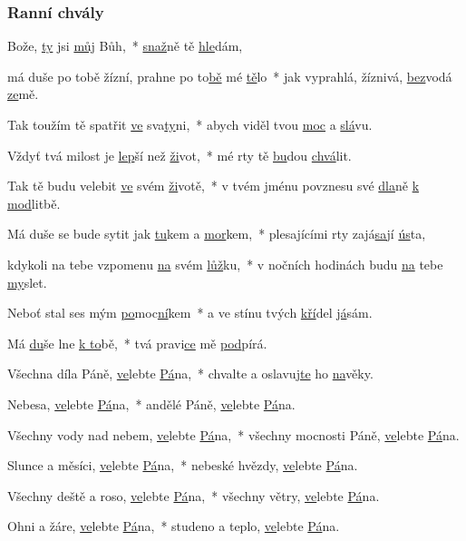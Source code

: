 
\subsubsection{Ranní chvály}


Bože, \underline{ty} jsi \underline{můj} Bůh,~*
\underline{snaž}ně tě \underline{hle}dám,

má duše po tobě žízní, prahne po to\underline{bě} mé \underline{tě}lo~*
jak vyprahlá, žíznivá, \underline{bez}vodá \underline{ze}mě.

Tak toužím tě spatřit \underline{ve} sva\underline{ty}ni,~*
abych viděl tvou \underline{moc} a \underline{slá}vu.

Vždyť tvá milost je \underline{lep}ší než \underline{ži}vot,~*
mé rty tě \underline{bu}dou \underline{chvá}lit.

Tak tě budu velebit \underline{ve} svém \underline{ži}votě,~*
v tvém jménu povznesu své \underline{dla}ně \underline{k mod}litbě.

Má duše se bude sytit jak \underline{tu}kem a \underline{mor}kem,~*
plesajícími rty zajá\underline{sa}jí \underline{ús}ta,

kdykoli na tebe vzpomenu \underline{na} svém \underline{lůž}ku,~*
v nočních hodinách budu \underline{na} tebe \underline{my}slet.

Neboť stal ses mým \underline{po}moc\underline{ní}kem~*
a ve stínu tvých \underline{kří}del \underline{já}sám.

Má \underline{du}še lne \underline{k to}bě,~*
tvá pravi\underline{ce} mě \underline{pod}pírá.


\newcommand{\velebteA}{\underline{ve}lebte \underline{Pá}na,~* }
\newcommand{\velebteB}{\underline{ve}lebte \underline{Pá}na. }

Všechna díla Páně, \velebteA
chvalte a oslavuj\underline{te} ho \underline{na}věky.

Nebesa, \velebteA
andělé Páně, \velebteB

Všechny vody nad nebem, \velebteA
všechny mocnosti Páně, \velebteB

Slunce a měsíci, \velebteA
nebeské hvězdy, \velebteB

Všechny deště a roso, \velebteA
všechny větry, \velebteB

Ohni a žáre, \velebteA
studeno a teplo, \velebteB

